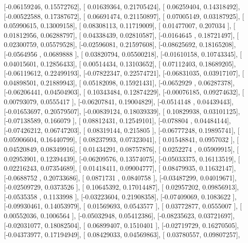 \documentclass{article}
\begin{document}
       [-0.06159246,  0.15572762],
       [ 0.01639364,  0.21705424],
       [ 0.06259404,  0.14318492],
       [-0.00522588,  0.17387672],
       [ 0.06691474,  0.21150897],
       [ 0.07005149,  0.03187925],
       [ 0.05990615,  0.13009158],
       [ 0.08308113,  0.11719009],
       [ 0.01477007,  0.207034  ],
       [ 0.01812956,  0.06288797],
       [ 0.04338439,  0.02810587],
       [-0.0164645 ,  0.18721497],
       [ 0.02300759,  0.05579528],
       [-0.02596081,  0.21597608],
       [-0.08625692,  0.18165208],
       [-0.0564956 ,  0.0689888 ],
       [ 0.03820794,  0.05500218],
       [-0.01610158,  0.10743345],
       [ 0.04015601,  0.12856433],
       [ 0.00514434,  0.13103652],
       [ 0.07112403,  0.18689205],
       [-0.06119612,  0.22499193],
       [-0.07822347,  0.22574721],
       [-0.06831035,  0.03917107],
       [ 0.04898501,  0.21889943],
       [ 0.05182098,  0.15921431],
       [-0.0652929 ,  0.06287378],
       [-0.06206441,  0.04504903],
       [ 0.10343484,  0.12874229],
       [-0.00076185,  0.09274632],
       [ 0.00793079,  0.0555417 ],
       [-0.06207841,  0.19004829],
       [-0.0514148 ,  0.04439443],
       [-0.01653697,  0.20579507],
       [-0.00839124,  0.18039339],
       [ 0.10829938,  0.03101125],
       [-0.07138589,  0.166079  ],
       [ 0.08812431,  0.12549101],
       [-0.078804  ,  0.04484144],
       [-0.07426212,  0.06747203],
       [ 0.08319144,  0.215805  ],
       [-0.06777248,  0.19895741],
       [ 0.05906604,  0.16440799],
       [ 0.08237993,  0.07323041],
       [ 0.01548841,  0.0957032 ],
       [ 0.04520849,  0.08349916],
       [ 0.01434291,  0.08757876],
       [ 0.0252274 ,  0.05909915],
       [ 0.02953901,  0.12394439],
       [-0.06209576,  0.13574075],
       [-0.05033375,  0.16113519],
       [ 0.02216243,  0.07354689],
       [ 0.01418411,  0.09004777],
       [ 0.08479935,  0.11632147],
       [-0.0688752 ,  0.20733686],
       [ 0.0871731 ,  0.0840758 ],
       [-0.03487299,  0.04019671],
       [-0.02509729,  0.0373526 ],
       [ 0.10645392,  0.17014487],
       [ 0.02957202,  0.09856913],
       [-0.0535358 ,  0.1133998 ],
       [-0.03223604,  0.21908358],
       [-0.07409069,  0.1083622 ],
       [-0.09930461,  0.14053979],
       [ 0.01569693,  0.0543577 ],
       [ 0.03772877,  0.0555007 ],
       [ 0.00552036,  0.1006564 ],
       [-0.05032948,  0.05412386],
       [-0.08235623,  0.03721697],
       [-0.02031077,  0.18082504],
       [ 0.06899407,  0.1510401 ],
       [-0.02719729,  0.16270505],
       [-0.04373977,  0.17194949],
       [ 0.08429033,  0.04569863],
       [ 0.03780557,  0.09807257],
\end{document}
